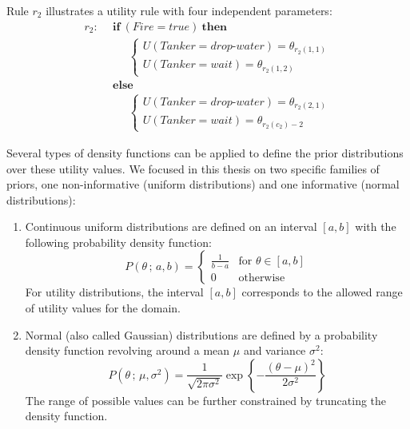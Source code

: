 Rule $r_{2}$ illustrates a utility rule with four independent parameters:
\begin{align*}
r_{2}: \ \ & \textbf{if} \ (\mathit{Fire}\!=\!\mathit{true}) \ \textbf{then} \\
& \;\;\;\;\;  \begin{cases}
U(\mathit{Tanker}\!=\!\mathit{drop\mbox{-}water}) = \theta_{r_{2}(1,1)} \\
U(\mathit{Tanker}\!=\!\mathit{wait}) = \theta_{r_{2}(1,2)}
\end{cases} \\
& \textbf{else} \\
& \;\;\;\;\; \begin{cases}
U (\mathit{Tanker}\!=\!\mathit{drop\mbox{-}water}) = \theta_{r_{2}(2,1)} \\
U(\mathit{Tanker}\!=\!\mathit{wait}) = \theta_{r_{2}(c_2)-2}
\end{cases}
\end{align*}

Several types of density functions can be applied to define the prior distributions over these utility values.  We focused in this thesis on two specific families of priors, one non-informative (uniform distributions) and one informative (normal distributions): 
\begin{enumerate}
\item Continuous uniform distributions are defined on an interval $[a,b]$ with the following probability density function: 
\begin{equation}
P(\theta \, ; \, a, b) = \begin{cases}
\frac{1}{b - a} & \text{for } \theta \in [a,b]  \\
0               & \text{otherwise}
\end{cases}
\end{equation}
For utility distributions, the interval $[a,b]$ corresponds to the allowed range of utility values for the domain.

\item Normal (also called Gaussian) distributions are defined by a probability density function revolving around a mean $\mu$ and variance $\sigma^2$:
\begin{equation}
P(\theta \, ; \, \mu, \sigma^2) = \frac{1}{\sqrt{2\pi\sigma^2}}\operatorname{exp}\left\{-\frac{\left(\theta-\mu\right)^2}{2\sigma^2}\right\}
\end{equation}
The range of possible values can be further constrained by truncating the density function.

\end{enumerate}

